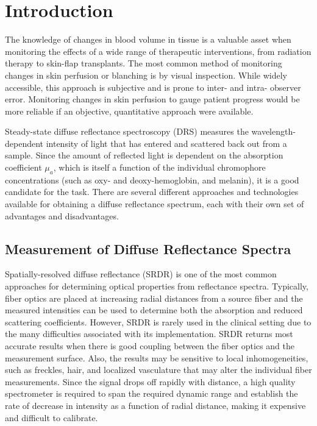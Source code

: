 \section{Introduction}
The knowledge of changes in blood volume in tissue is a valuable asset when monitoring the effects of a wide range of therapeutic interventions, from radiation therapy\cite{Farrell2004,Fitzgerald2008,Russell1994,Wengstrom2004} to skin-flap transplants.\cite{Steele2011} The most common method of monitoring changes in skin perfusion or blanching is by visual inspection.\cite{Wengstrom2004, CTCAE403} While widely accessible, this approach is subjective and is prone to inter- and intra- observer error.\cite{Diffey1991} Monitoring changes in skin perfusion to gauge patient progress would be more reliable if an objective, quantitative approach were available.

Steady-state diffuse reflectance spectroscopy (DRS) measures the wavelength-dependent intensity of light that has entered and scattered back out from a sample.\cite{Kim2011} Since the amount of reflected light is dependent on the absorption coefficient $\mu_a$, which is itself a function of the individual chromophore concentrations (such as oxy- and deoxy-hemoglobin, and melanin), it is a good candidate for the task. There are several different approaches and technologies available for obtaining a diffuse reflectance spectrum, each with their own set of advantages and disadvantages.

\subsection{Measurement of Diffuse Reflectance Spectra}
Spatially-resolved diffuse reflectance (SRDR) is one of the most common approaches for determining optical properties from reflectance spectra. Typically, fiber optics are placed at increasing radial distances from a source fiber and the measured intensities can be used to determine both the absorption and reduced scattering coefficients.\cite{Kim2011} However, SRDR is rarely used in the clinical setting due to the many difficulties associated with its implementation. SRDR returns most accurate results when there is good coupling between the fiber optics and the measurement surface. Also, the results may be sensitive to local inhomogeneities, such as freckles, hair, and localized vasculature that may alter the individual fiber measurements. Since the signal drops off rapidly with distance, a high quality spectrometer is required to span the required dynamic range and establish the rate of decrease in intensity as a function of radial distance, making it expensive and difficult to calibrate.


